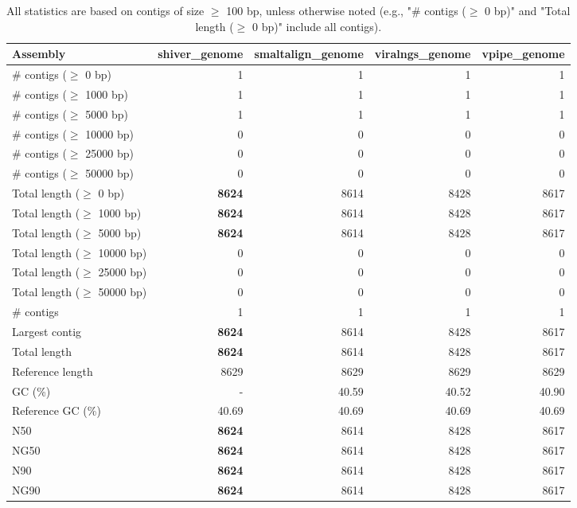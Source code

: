 \documentclass[12pt,a4paper]{article}
\begin{document}
\begin{table}[ht]
\begin{center}
\caption{All statistics are based on contigs of size $\geq$ 100 bp, unless otherwise noted (e.g., "\# contigs ($\geq$ 0 bp)" and "Total length ($\geq$ 0 bp)" include all contigs).}
\begin{tabular}{|l*{4}{|r}|}
\hline
Assembly & shiver\_genome & smaltalign\_genome & viralngs\_genome & vpipe\_genome \\ \hline
\# contigs ($\geq$ 0 bp) & 1 & 1 & 1 & 1 \\ \hline
\# contigs ($\geq$ 1000 bp) & 1 & 1 & 1 & 1 \\ \hline
\# contigs ($\geq$ 5000 bp) & 1 & 1 & 1 & 1 \\ \hline
\# contigs ($\geq$ 10000 bp) & 0 & 0 & 0 & 0 \\ \hline
\# contigs ($\geq$ 25000 bp) & 0 & 0 & 0 & 0 \\ \hline
\# contigs ($\geq$ 50000 bp) & 0 & 0 & 0 & 0 \\ \hline
Total length ($\geq$ 0 bp) & {\bf 8624} & 8614 & 8428 & 8617 \\ \hline
Total length ($\geq$ 1000 bp) & {\bf 8624} & 8614 & 8428 & 8617 \\ \hline
Total length ($\geq$ 5000 bp) & {\bf 8624} & 8614 & 8428 & 8617 \\ \hline
Total length ($\geq$ 10000 bp) & 0 & 0 & 0 & 0 \\ \hline
Total length ($\geq$ 25000 bp) & 0 & 0 & 0 & 0 \\ \hline
Total length ($\geq$ 50000 bp) & 0 & 0 & 0 & 0 \\ \hline
\# contigs & 1 & 1 & 1 & 1 \\ \hline
Largest contig & {\bf 8624} & 8614 & 8428 & 8617 \\ \hline
Total length & {\bf 8624} & 8614 & 8428 & 8617 \\ \hline
Reference length & 8629 & 8629 & 8629 & 8629 \\ \hline
GC (\%) & - & 40.59 & 40.52 & 40.90 \\ \hline
Reference GC (\%) & 40.69 & 40.69 & 40.69 & 40.69 \\ \hline
N50 & {\bf 8624} & 8614 & 8428 & 8617 \\ \hline
NG50 & {\bf 8624} & 8614 & 8428 & 8617 \\ \hline
N90 & {\bf 8624} & 8614 & 8428 & 8617 \\ \hline
NG90 & {\bf 8624} & 8614 & 8428 & 8617 \\ \hline

\end{tabular}
\end{center}
\end{table}
\end{document}
